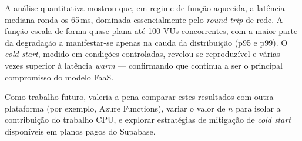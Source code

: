 \documentclass[conference]{IEEEtran}
\begin{document}
A análise quantitativa mostrou que, em regime de função aquecida, a latência mediana ronda os 65\,ms, dominada essencialmente pelo \textit{round-trip} de rede. A função escala de forma quase plana até 100 VUs concorrentes, com a maior parte da degradação a manifestar-se apenas na cauda da distribuição (p95 e p99). O \textit{cold start}, medido em condições controladas, revelou-se reproduzível e várias vezes superior à latência \textit{warm} — confirmando que continua a ser o principal compromisso do modelo FaaS.

Como trabalho futuro, valeria a pena comparar estes resultados com outra plataforma (por exemplo, Azure Functions), variar o valor de $n$ para isolar a contribuição do trabalho CPU, e explorar estratégias de mitigação de \textit{cold start} disponíveis em planos pagos do Supabase.
\end{document}
